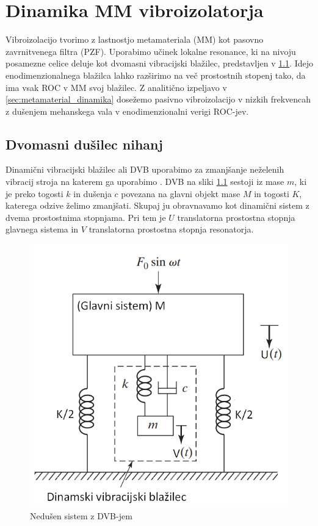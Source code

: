 \chapter{Dinamika MM vibroizolatorja}\label{sec:dinamika_metamaterialnega_vibroizolatorja}
    
    Vibroizolacijo tvorimo z lastnostjo metamateriala (MM) kot pasovno zavrnitvenega filtra (PZF). Uporabimo učinek lokalne resonance, ki na nivoju posamezne celice deluje kot dvomasni vibracijski blažilec, predstavljen v \ref{sec:dvomasni_dušilec_nihanj}. Idejo enodimenzionalnega blažilca lahko razširimo na več prostostnih stopenj tako, da ima vsak ROC v MM svoj blažilec. Z analitično izpeljavo v \ref{sec:metamaterial_dinamika} dosežemo pasivno vibroizolacijo v nizkih frekvencah z dušenjem mehanskega vala v enodimenzionalni verigi ROC-jev.
        
    \section{Dvomasni dušilec nihanj}\label{sec:dvomasni_dušilec_nihanj}
  
        Dinamični vibracijski blažilec ali DVB uporabimo za zmanjšanje neželenih vibracij stroja na katerem ga uporabimo \cite{rao2017mechanical}. DVB na sliki \ref{fig:sistem_2ps} sestoji iz mase $m$, ki je preko togosti $k$ in dušenja $c$ povezana na glavni objekt mase $M$ in togosti $K$, katerega odzive želimo zmanjšati. Skupaj ju obravnavamo kot dinamični sistem z dvema prostostnima stopnjama. Pri tem je $U$ translatorna prostostna stopnja glavnega sistema in $V$ translatorna prostostna stopnja resonatorja.
        \begin{figure}[!htb]
            \centering
            \includegraphics[scale=0.65]{slike/teorija/sistem_2ps.png}
            \caption{Nedušen sistem z DVB-jem}\label{fig:sistem_2ps}
        \end{figure}
        
